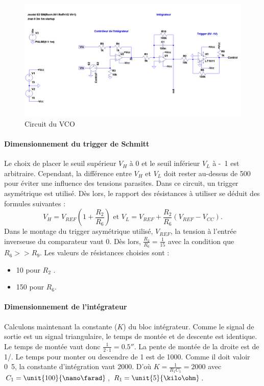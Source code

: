 \begin{figure}[ht]
	\centering
	\includegraphics[scale=0.3]{img-vco/vco_circuit}
	\caption{Circuit du VCO}
	\label{fig:circuit_vco}
\end{figure}

\paragraph{Dimensionnement du trigger de Schmitt}
Le choix de placer le seuil supérieur $V_H$ à \unit{0}{\volt} 
et le seuil inférieur $V_L$ à \unit{-1}{\volt} est arbitraire. 
Cependant, la différence entre $V_H$ et $V_L$ doit rester au-dessus
de \unit{500}{\milli\volt} pour éviter une influence des tensions parasites.
Dans ce circuit, un trigger asymétrique est utilisé. Dès lors, le rapport
des résistances à utiliser se déduit des formules suivantes : 
\[ V_H = V_{REF}\left(1+\frac{R_2}{R_6}\right) \text{ et } V_L = V_{REF} + \frac{R_2}{R_6}\left(V_{REF}-V_{CC}\right). \]
Dans le montage du trigger asymétrique utilisé, $V_{REF}$, la tension à l'entrée
inverseuse du comparateur vaut \unit{0}{\volt}. Dès lors, $\frac{R_2}{R_6}=\frac{1}{15}$
avec la condition que $R_6 >> R_9$. Les valeurs de résistances choisies sont :

\begin{itemize}
	\item \unit{10}{\kilo\ohm} pour $R_2$ .
	\item \unit{150}{\kilo\ohm} pour $R_6$.
\end{itemize}

\paragraph{Dimensionnement de l'intégrateur}
Calculons maintenant la constante ($K$) du bloc intégrateur. 
Comme le signal de sortie est un signal triangulaire, le temps de montée et de descente est 
identique. Le temps de montée vaut donc $\frac{1}{2\cdot1} = \unit{0.5}{\second}$. 
La pente de montée de la droite est de \unit{1}{\milli\volt}/\unit{}{\second}. 
Le temps pour monter ou descendre de \unit{1}{\volt} est de \unit{1000}{\second}. 
Comme il doit valoir \unit{0.5}{\second}, la constante d'intégration vaut 2000. D'où 
$K=\frac{1}{R_1C_1} = 2000$ avec $C_1= \unit{100}{\nano\farad}$, $R_1 = \unit{5}{\kilo\ohm}$.
